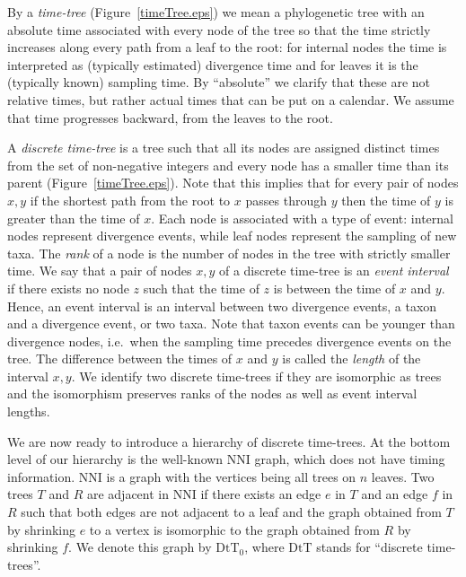 \documentclass[11pt]{amsart}
\theoremstyle{definition}
\newcommand{\nni}{\mathrm{NNI}}
\newcommand{\dtt}{\mathrm{DtT}}
\begin{document}
By a \emph{time-tree} (Figure~\ref{timeTree.eps}) we mean a phylogenetic tree with an absolute time associated with every node of the tree so that the time strictly increases along every path from a leaf to the root: for internal nodes the time is interpreted as (typically estimated) divergence time and for leaves it is the (typically known) sampling time.
By ``absolute'' we clarify that these are not relative times, but rather actual times that can be put on a calendar.
We assume that time progresses backward, from the leaves to the root.

A \emph{discrete time-tree} is a tree such that all its nodes are assigned distinct times from the set of non-negative integers and every node has a smaller time than its parent (Figure~\ref{timeTree.eps}).
Note that this implies that for every pair of nodes $x,y$ if the shortest path from the root to $x$ passes through $y$ then the time of $y$ is greater than the time of $x$.
Each node is associated with a type of event: internal nodes represent divergence events, while leaf nodes represent the sampling of new taxa.
The \emph{rank} of a node is the number of nodes in the tree with strictly smaller time.
We say that a pair of nodes $x,y$ of a discrete time-tree is an \emph{event interval} if there exists no node $z$ such that the time of $z$ is between the time of $x$ and $y$.
Hence, an event interval is an interval between two divergence events, a taxon and a divergence event, or two taxa.
Note that taxon events can be younger than divergence nodes, i.e.\ when the sampling time precedes divergence events on the tree.
The difference between the times of $x$ and $y$ is called the \emph{length} of the interval $x,y$.
We identify two discrete time-trees if they are isomorphic as trees and the isomorphism preserves ranks of the nodes as well as event interval lengths.

We are now ready to introduce a hierarchy of discrete time-trees.
At the bottom level of our hierarchy is the well-known $\nni$ graph, which does not have timing information.
$\nni$ is a graph with the vertices being all trees on $n$ leaves.
Two trees $T$ and $R$ are adjacent in $\nni$ if there exists an edge $e$ in $T$ and an edge $f$ in $R$ such that both edges are not adjacent to a leaf and the graph obtained from $T$ by shrinking $e$ to a vertex is isomorphic to the graph obtained from $R$ by shrinking $f$.
We denote this graph by $\dtt_0$, where $\dtt$ stands for ``discrete time-trees''.
\end{document}
